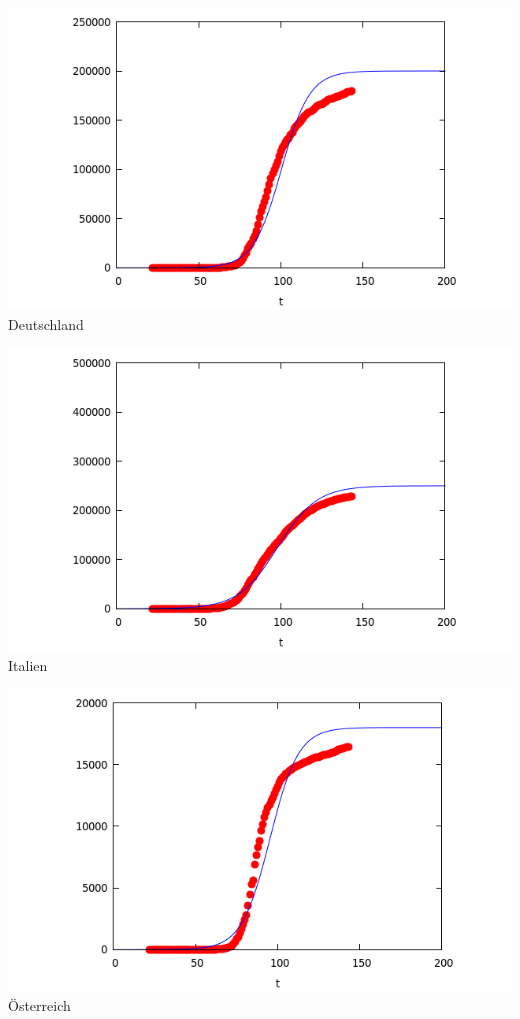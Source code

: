 \documentclass[a4paper,11pt]{article}
\begin{document}
\begin{center}
  \begin{minipage}{.3\textwidth}\centering
    \includegraphics[width=\textwidth]{Germany-2.png}\\[1em] {Deutschland}
  \end{minipage}\hfill
  \begin{minipage}{.3\textwidth}\centering
    \includegraphics[width=\textwidth]{Italy-2.png}\\[1em] {Italien}
  \end{minipage}\hfill
  \begin{minipage}{.3\textwidth}\centering
    \includegraphics[width=\textwidth]{Austria-2.png}\\[1em] {Österreich}
  \end{minipage}
  

\end{center}
\end{document}
